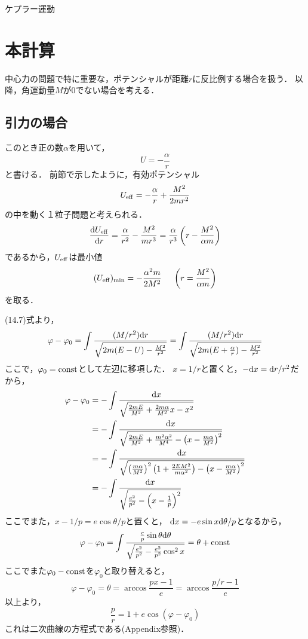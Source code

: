 \documentclass[12pt]{jsarticle}
\begin{document}
	\begin{center}
		\Large{ケプラー運動}
	\end{center}
	
	\section{本計算}
	中心力の問題で特に重要な，ポテンシャルが距離$r$に反比例する場合を扱う．
	以降，角運動量$M$が$0$でない場合を考える．
	
	\subsection{引力の場合}
	このとき正の数$\alpha$を用いて，
	\[
	U = -\frac{\alpha}{r}
	\]
	と書ける．
	前節で示したように，有効ポテンシャル
	\[
	U_{\rm eff} = -\frac{\alpha}{r} + \frac{M^2}{2mr^2}
	\]
	の中を動く１粒子問題と考えられる．
	\[
	\frac{{\rm d}U_{\rm eff}}{{\rm d}r}
	= \frac{\alpha}{r^2} - \frac{M^2}{mr^3}
	= \frac{\alpha}{r^3} \left( r - \frac{M^2}{\alpha m} \right)
	\]
	であるから，$U_{\rm eff}$は最小値
	\[
	(U_{\rm eff})_{\rm min} = -\frac{\alpha^2 m}{2M^2} \ \ \ \
	\left( r = \frac{M^2}{\alpha m} \right)
	\]
	を取る．
	
	(14.7)式より，
	\[
	\varphi - \varphi_0
	= \int \frac{(M/r^2){\rm d}r}{\sqrt{2m(E-U)-\frac{M^2}{r^2}}}
	= \int \frac{(M/r^2){\rm d}r}{\sqrt{2m(E+\frac{\alpha}{r})-\frac{M^2}{r^2}}}
	\]
	ここで，$\varphi_0 = {\rm const}$として左辺に移項した．
	$x=1/r$と置くと，$-{\rm d}x = {\rm d}r/r^2$だから，
	\begin{align*}
	\varphi - \varphi_0
	&= -\int \frac{{\rm d}x}{\sqrt{\frac{2mE}{M^2} + \frac{2m\alpha}{M^2}x - x^2}} \\
	&= -\int \frac{{\rm d}x}{\sqrt{\frac{2mE}{M^2} + \frac{m^2\alpha^2}{M^4} -
		\left( x - \frac{m\alpha}{M^2} \right)^2}} \\
	&= -\int \frac{{\rm d}x}{\sqrt{\left( \frac{m\alpha}{M^2} \right)^2
		\left( 1 + \frac{2EM^2}{m\alpha^2} \right) -
		\left( x - \frac{m\alpha}{M^2} \right)^2}} \\
	&= -\int \frac{{\rm d}x}{\sqrt{\frac{e^2}{p^2} - \left( x - \frac{1}{p} \right)^2}}
	\end{align*}
	ここでまた，$x-1/p = e\cos{\theta}/p$と置くと，
	${\rm d}x = -e\sin{x}{\rm d}\theta /p$となるから，
	\[
	\varphi - \varphi_0 = \int\frac{{\frac{e}{p}\sin{\theta}{\rm d}\theta}}
		{{\sqrt{\frac{e^2}{p^2} - \frac{e^2}{p^2} \cos^2{x}}}} = \theta + {\rm const}
	\]
	ここでまた$\varphi_0 - {\rm const}$を$\varphi_0$と取り替えると，
	\[
	\varphi - \varphi_0 = \theta = \arccos{\frac{px-1}{e}}
		= \arccos\frac{{p/r-1}}{e}
	\]
	以上より，
	\[
	\frac{p}{r} = 1 + e\cos({\varphi - \varphi_0})
	\]
	これは二次曲線の方程式である(Appendix参照)．
	
\end{document}
